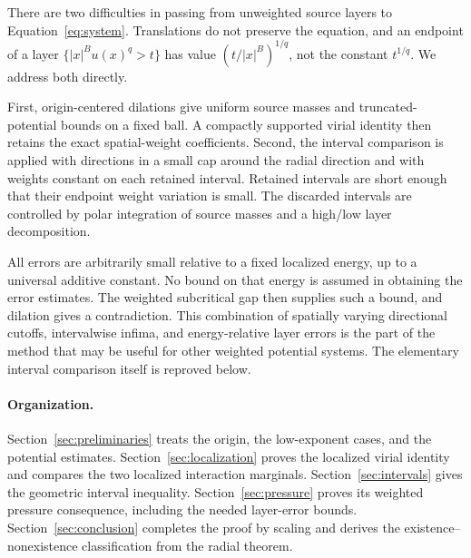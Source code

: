 There are two difficulties in passing from unweighted source layers
to Equation~\eqref{eq:system}. Translations do not preserve the
equation, and an endpoint of a layer
\(\{|x|^B u(x)^q>t\}\) has value
\((t/|x|^B)^{1/q}\), not the constant \(t^{1/q}\).
We address both directly.

First, origin-centered dilations give uniform source masses and
truncated-potential bounds on a fixed ball. A compactly supported
virial identity then retains the exact spatial-weight coefficients.
Second, the interval comparison is applied with directions in a
small cap around the radial direction and with weights constant on
each retained interval. Retained intervals are short enough that
their endpoint weight variation is small. The discarded intervals
are controlled by polar integration of source masses and a
high/low layer decomposition.

All errors are arbitrarily small relative to a fixed localized
energy, up to a universal additive constant. No bound on that energy
is assumed in obtaining the error estimates. The weighted
subcritical gap then supplies such a bound, and dilation gives a
contradiction. This combination of spatially varying directional
cutoffs, intervalwise infima, and energy-relative layer errors is
the part of the method that may be useful for other weighted
potential systems. The elementary interval comparison itself is
reproved below.

\paragraph{Organization.}
Section~\ref{sec:preliminaries} treats the origin, the low-exponent
cases, and the potential estimates.
Section~\ref{sec:localization} proves the localized virial identity
and compares the two localized interaction marginals.
Section~\ref{sec:intervals} gives the geometric interval inequality.
Section~\ref{sec:pressure} proves its weighted pressure consequence,
including the needed layer-error bounds.
Section~\ref{sec:conclusion} completes the proof by scaling and derives
the existence--nonexistence classification from the radial theorem.
